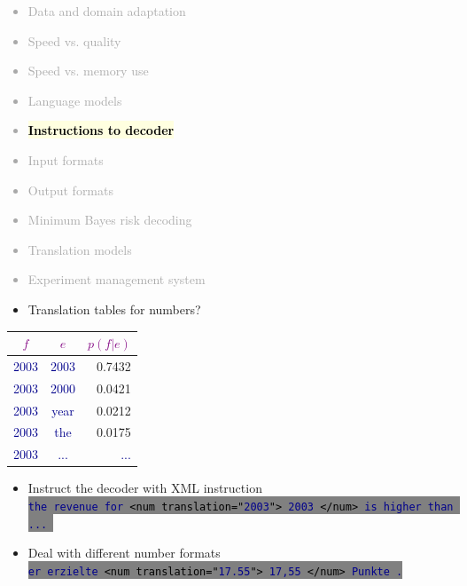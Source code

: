 \documentclass[landscape]{uedslides2C}
\newcommand{\example}[1]{\textcolor{darkblue}{\rm #1}}
\newcommand{\maths}[1]{\textcolor{purple}{#1}}
\newcommand{\currenttopic}[1]{\colorbox{lightyellow}{\textcolor{black}{\bf #1}}}
\newcommand{\littlecode}[1]{\colorbox{gray}{\textcolor{black}{\small \tt #1}}}
\begin{document}

\vspace{-5mm}
\textcolor{darkgrey}{
\begin{itemize} \itemsep -1mm
\item Data and domain adaptation
\item Speed vs. quality
\item Speed vs. memory use
\item Language models
\item \currenttopic{Instructions to decoder}
\item Input formats
\item Output formats
\item Minimum Bayes risk decoding
\item Translation models
\item Experiment management system
\end{itemize}
}



\begin{itemize}
\item Translation tables for numbers?
\end{itemize}
\begin{center} \begin{tabular}{c|c|r}
\maths{$f$} & \maths{$e$} & \maths{$p(f|e)$} \\ \hline
\example{2003} & \example{2003} & 0.7432 \\ \hline
\example{2003} & \example{2000} & 0.0421 \\ \hline
\example{2003} & \example{year} & 0.0212 \\ \hline
\example{2003} & \example{the} & 0.0175 \\ \hline
\example{2003} & \example{...} & \example{...} \\ \hline
\end{tabular} \end{center}
\begin{itemize}
\item Instruct the decoder with XML instruction\\[2mm]
\littlecode{\example{the revenue for} <num translation="\example{2003}"> \example{2003}
  </num> \example{is higher than ...} }
\item Deal with different number formats\\[2mm]
\littlecode{\example{er erzielte} <num translation="\example{17.55}"> \example{17,55} </num> \example{Punkte .}}
\end{itemize}
\end{document}
